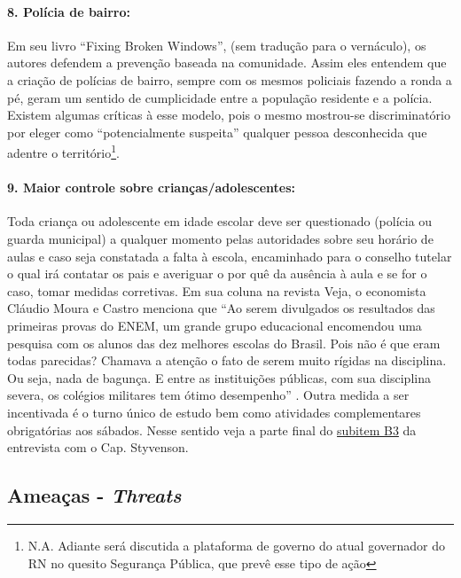 \documentclass[
	12pt,				%
	openright,			%
	twoside,			%
	a4paper,			%
	chapter=TITLE,		%
	section=TITLE,		%
	subsection=TITLE,	%
	subsubsection=TITLE,%
	spanish,            %
	english,			%
	brazil				%
	]{abntex2}
\begin{document}
\paragraph*{\textbf{8. Polícia de bairro:}} Em seu livro “Fixing Broken Windows”, (sem tradução para o vernáculo), os autores defendem a prevenção baseada na comunidade. Assim eles entendem que a criação de polícias de bairro, sempre com os mesmos policiais fazendo a ronda a pé, geram um sentido de cumplicidade entre a população residente e a polícia. Existem algumas críticas à esse modelo, pois o mesmo mostrou-se discriminatório por eleger como “potencialmente suspeita” qualquer pessoa desconhecida que adentre o território\footnote{N.A. Adiante será discutida a plataforma de governo do atual governador do RN no quesito Segurança Pública, que prevê esse tipo de ação}.
\hypertarget{O9}{}
\paragraph*{\textbf{9. Maior controle sobre crianças/adolescentes:}} Toda criança ou adolescente em idade escolar deve ser questionado (polícia ou guarda municipal) a qualquer momento pelas autoridades sobre seu horário de aulas e caso seja constatada a falta à escola, encaminhado para o conselho tutelar o qual irá contatar os pais e averiguar o por quê da ausência à aula e se for o caso, tomar medidas corretivas. Em sua coluna na revista Veja, o economista Cláudio Moura e Castro  menciona que “Ao serem divulgados os resultados das primeiras
provas do ENEM, um grande grupo educacional encomendou uma pesquisa com os alunos das dez melhores escolas do Brasil. Pois não é que eram todas parecidas? Chamava a atenção o fato de serem muito rígidas na disciplina. Ou seja, nada de bagunça. E entre as instituições públicas, com sua disciplina severa, os colégios militares tem ótimo desempenho” . Outra medida a ser incentivada é o turno único de estudo bem como atividades complementares obrigatórias aos sábados. Nesse sentido veja a parte final do \hyperlink{B3}{subitem B3} da entrevista com o Cap. Styvenson.\\

\subsection{Ameaças - \textit{Threats}}
\hypertarget{T1}{}
\end{document}
